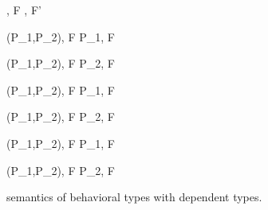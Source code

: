 \begin{figure}
\begin{minipage}{\textwidth}
{ \langle \Endconst, F \rangle \rightarrow {}, F' \rangle }


\begin{minipage}{0.5\textwidth}
{ \langle \Sirx (P_1,P_2), F \rangle \rightarrow \langle P_1, F \rangle }
\end{minipage}
\begin{minipage}{0.5\textwidth}
{ \langle \Sirx (P_1,P_2), F \rangle \rightarrow \langle P_2, F \rangle }
\end{minipage}
\vspace{2mm}

\begin{minipage}{0.5\textwidth}
{ \langle \Sirx (P_1,P_2), F \rangle \rightarrow \langle P_1, F \rangle }
\end{minipage}
\begin{minipage}{0.5\textwidth}
{ \langle \Sirx (P_1,P_2), F \rangle \rightarrow \langle P_2, F \rangle }
\end{minipage}


{ \langle \Sirx (P_1,P_2), F \rangle \rightarrow \langle P_1, F\cup{\snull} \rangle }

{ \langle \Sirx (P_1,P_2), F \rangle \rightarrow \langle P_2, F\cup{\snnull} \rangle }

 



\end{minipage}
\caption{semantics of behavioral types with dependent types.}
\label{fig:bdRules}
\end{figure}

